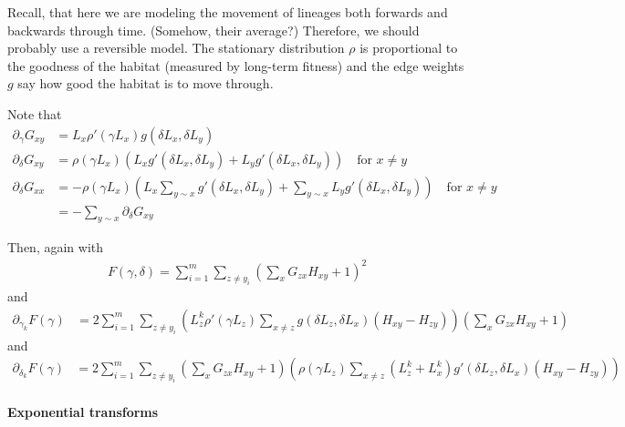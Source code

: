 \documentclass{article}
\begin{document}
Recall, that here we are modeling the movement of lineages both forwards and backwards through time.
(Somehow, their average?)
Therefore, we should probably use a reversible model.
The stationary distribution $\rho$ is proportional to the goodness of the habitat
(measured by long-term fitness)
and the edge weights $g$ say how good the habitat is to move through.

Note that
\begin{align}
  \partial_\gamma G_{xy} &= L_x \rho'( \gamma L_x ) g( \delta L_x, \delta L_y ) \\
  \partial_\delta G_{xy} &= \rho( \gamma L_x ) \left( L_x g'( \delta L_x, \delta L_y )  + L_y g'( \delta L_x, \delta L_y ) \right ) 
      \quad \text{for } x \neq y \\
      \partial_\delta G_{xx} &=  - \rho( \gamma L_x ) \left( L_x \sum_{y \sim x} g'(\delta L_x, \delta L_y) + \sum_{y \sim x} L_y g'( \delta L_x, \delta L_y ) \right) \quad \text{for } x \neq y \\
      &= - \sum_{y \sim x} \partial_\delta G_{xy} 
\end{align}

Then, again with
\begin{align}
  F(\gamma,\delta) = \sum_{i=1}^m \sum_{z \neq y_i} \left( \sum_x G_{zx} H_{xy} + 1 \right)^2 
\end{align}
and
\begin{align}
  \partial_{\gamma_k} F(\gamma) &= 2 \sum_{i=1}^m \sum_{z \neq y_i} \left( L^k_z \rho'(\gamma L_z) \sum_{x \neq z} g(\delta L_z, \delta L_x) (H_{xy}-H_{zy}) \right) \left( \sum_x G_{zx} H_{xy} + 1 \right)  
\end{align}
and
\begin{align}
  \partial_{\delta_k} F(\gamma) &= 2 \sum_{i=1}^m \sum_{z \neq y_i} 
    \left( \sum_x G_{zx} H_{xy} + 1 \right) 
  \left( \rho(\gamma L_z) 
    \sum_{x \neq z} (L^k_z + L^k_x) g'(\delta L_z, \delta L_x) ( H_{xy} - H_{zy} ) 
  \right) 
\end{align}


\paragraph{Exponential transforms}
\end{document}
